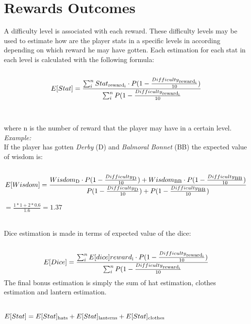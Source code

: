 \section{Rewards Outcomes}
A difficulty level is associated with each reward. These difficulty levels may be used to estimate how are the player stats in a specific levels in according depending on which reward he may have gotten. Each estimation for each stat in each level is calculated with the following formula: \\\\
\begin{equation}
  E[Stat]= \frac{\sum_{i}^{n} Stat\textsubscript{reward\textsubscript{i}}
  \cdot
  P(1-\frac{Difficulty\textsubscript{reward\textsubscript{i}}}{10})}
  {\sum_{i}^{n}P(1-\frac{Difficulty\textsubscript{reward\textsubscript{i}}}{10}}
\end{equation}
\\\\
where n is the number of reward that the player may have in a certain level.\\
\textit{Example:}\\
If the player has gotten \textit{Derby} (D) and \textit{Balmoral Bonnet} (BB) the expected value of wisdom is:\\\\
\begin{equation}
E[Wisdom]= \frac{Wisdom\textsubscript{D} \cdot P(1-\frac{Difficulty\textsubscript{D}}{10}) +
  Wisdom\textsubscript{BB} \cdot P(1-\frac{Difficulty\textsubscript{BB}}{10})}
{P(1-\frac{Difficulty\textsubscript{D}}{10})+P(1-\frac{Difficulty\textsubscript{BB}}{10})} 
\end{equation}
\begin{center}
  $= \frac{1*1 + 2*0.6}{1.6} =1.37$
  \end{center}
\\
Dice estimation is made in terms of expected value of the dice:\\\\
\begin{equation}
  E[Dice]= \frac{\sum_{i}^{n} E[dice]{reward\textsubscript{i}}
  \cdot
  P(1-\frac{Difficulty\textsubscript{reward\textsubscript{i}}}{10})}
  {\sum_{i}^{n}P(1-\frac{Difficulty\textsubscript{reward\textsubscript{i}}}{10}}
\end{equation}
The final bonus estimation is simply the sum of hat estimation, clothes estimation and lantern estimation.\\\\
\begin{center}
  $E[Stat]=E[Stat]\textsubscript{hats} + E[Stat]\textsubscript{lanterns} + E[Stat]\textsubscript{clothes}$
  \end{center}

